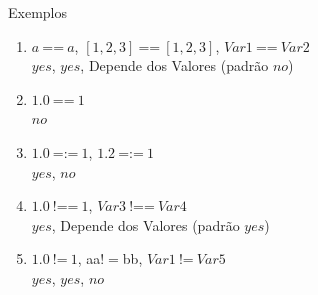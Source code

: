 \begin{frame}

	\begin{exampleblock}{Exemplos}
    	
    	\begin{enumerate}
    	
          \item $a\:$==$\:a$, \: $[1,2,3]\:$==$\:[1,2,3]$, \: $Var1\:$==$\:Var2$\\
          \pause
          $yes$, $yes$, Depende dos Valores (padrão $no$)
          \medskip
          \pause
          
          \item $1.0\:$==$\:1$\\
          \pause
          $no$
          \medskip
          \pause
          
          \item $1.0\:$=:=$\:1$, \: $1.2\:$=:=$\:1$\\
          \pause
          $yes$, $no$
          \medskip
          \pause

          \item $1.0\:$!==$\:1$, \: $Var3\:$!==$\:Var4$\\
          \pause
          $yes$, Depende dos Valores (padrão $yes$)
          \medskip
          \pause

          \item $1.0\:$!=$\:1$, \: aa\:$!=$\:bb, \: $Var1\:$!=$\:Var5$\\
          \pause
          $yes$, $yes$, $no$
          
        \end{enumerate}
	\end{exampleblock}
    
\end{frame}


